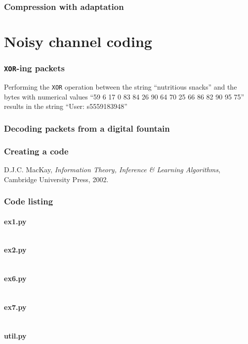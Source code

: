 \documentclass[10pt,a4paper,twoside,onecolumn]{article}
\newcommand*{\XOR}{{\tt XOR}\xspace}
\begin{document}
\section{Compression with adaptation}\label{sec:ex5}


\part{Noisy channel coding}

\section{\XOR-ing packets}\label{sec:ex6}

Performing the \XOR operation between the string ``nutritious snacks'' and the
bytes with numerical values ``59 6 17 0 83 84 26 90 64 70 25 66 86 82 90 95 75''
results in the string ``User: s5559183948''

\section{Decoding packets from a digital fountain}\label{sec:ex7}
\section{Creating a code}\label{sec:ex8}


\begin{thebibliography}{9}

    D.J.C. MacKay,
    \emph{Information Theory, Inference \& Learning Algorithms},
    Cambridge University Press,
    2002.

\end{thebibliography}


\onecolumn
\appendixpage
\appendix

\section{Code listing}

\subsection{ex1.py}\label{app:ex1}
\inputminted{python}{../src/ex1.py}

\subsection{ex2.py}\label{app:ex2}
\inputminted{python}{../src/ex2.py}

\subsection{ex6.py}\label{app:ex6}
\inputminted{python}{../src/ex6.py}

\subsection{ex7.py}\label{app:ex7}
\inputminted{python}{../src/ex7.py}

\subsection{util.py}\label{app:util}
\inputminted{python}{../src/util.py}
\end{document}
